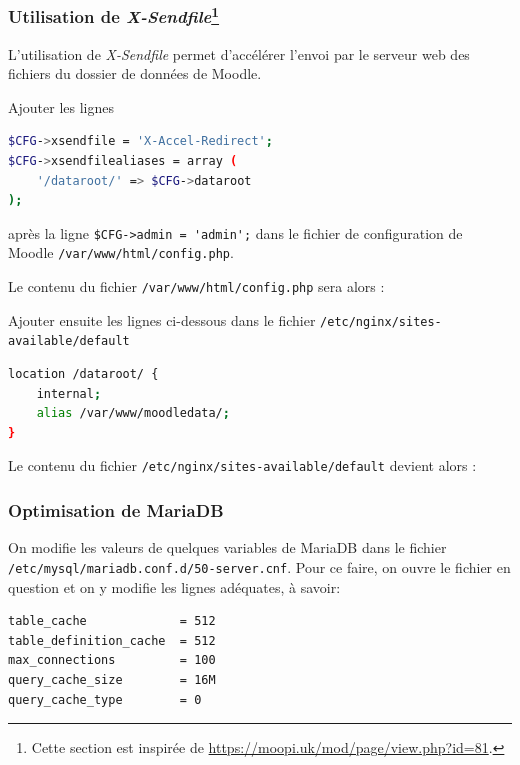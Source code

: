 \documentclass[11pt]{article}
\begin{document}
\subsubsection[Utilisation de \emph{X-Sendfile}]{Utilisation de \emph{X-Sendfile}\footnote{Cette section est inspirée de \url{https://moopi.uk/mod/page/view.php?id=81}.}}

L'utilisation de \emph{X-Sendfile} permet d'accélérer l'envoi par le serveur web des fichiers du dossier de données de Moodle.

Ajouter les lignes
\begin{lstlisting}[language=bash]
$CFG->xsendfile = 'X-Accel-Redirect';
$CFG->xsendfilealiases = array (
    '/dataroot/' => $CFG->dataroot
);
\end{lstlisting}
après la ligne \lstinline{$CFG->admin = 'admin';} dans le fichier de configuration de Moodle \lstinline{/var/www/html/config.php}.


Le contenu du fichier \lstinline{/var/www/html/config.php} sera alors :


Ajouter ensuite les lignes ci-dessous dans le fichier \lstinline{/etc/nginx/sites-available/default}

\begin{lstlisting}[language=bash]
location /dataroot/ {
    internal;
    alias /var/www/moodledata/;
}
\end{lstlisting}

Le contenu du fichier \lstinline{/etc/nginx/sites-available/default} devient alors :


\subsubsection{Optimisation de MariaDB}

On modifie les valeurs de quelques variables de MariaDB dans le fichier \lstinline{/etc/mysql/mariadb.conf.d/50-server.cnf}. Pour ce faire, on ouvre le fichier en question
et on y modifie les lignes adéquates, à savoir:
\begin{lstlisting}[language=bash]
table_cache             = 512
table_definition_cache  = 512
max_connections         = 100
query_cache_size        = 16M
query_cache_type        = 0
\end{lstlisting}
\end{document}
